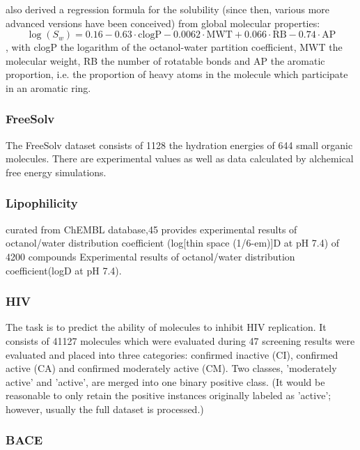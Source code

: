 \cite{Delaney.2004} also derived a regression formula for the solubility (since then, various more advanced versions have been conceived) from global molecular properties:
\[
\log(S_w) = 0.16 - 0.63 \cdot \text{clogP} - 0.0062 \cdot \text{MWT} + 0.066 \cdot \text{RB} - 0.74 \cdot \text{AP}
\],
with clogP the logarithm of the octanol-water partition coefficient, MWT the molecular weight, RB the number of rotatable bonds and AP the aromatic proportion, i.e. the proportion of heavy atoms in the molecule which participate in an aromatic ring.


\subsubsection{FreeSolv}

The FreeSolv dataset consists of 1128 the hydration energies of 644  small organic molecules. There are experimental values as well as data calculated by alchemical free energy simulations.
\cite{Mobley.2014}


\subsubsection{Lipophilicity}

curated from ChEMBL database,45 provides experimental results of octanol/water distribution coefficient (log[thin space (1/6-em)]D at pH 7.4) of 4200 compounds
Experimental results of octanol/water distribution coefficient(logD at pH 7.4).

\subsubsection{HIV}

The task is to predict the ability of molecules to inhibit HIV replication.
It consists of 41127 molecules which were evaluated during 47 screening results were evaluated and placed into three categories: confirmed inactive (CI), confirmed active (CA) and confirmed moderately active (CM).
Two classes, 'moderately active' and 'active', are merged into one binary positive class. (It would be reasonable to only retain the positive instances originally labeled as 'active'; however, usually the full dataset is processed.)





\subsubsection{BACE}


